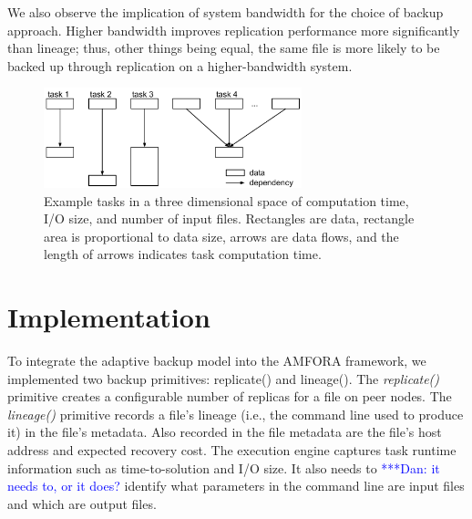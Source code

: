 \documentclass{sig-alternate}
\newcommand{\katznote}[1]{ {\textcolor{blue}    { ***Dan:      #1 }}}
\newcommand{\katznote}[1]{}
\begin{document}
We also observe the implication of system bandwidth for the choice of backup approach.
Higher bandwidth improves replication performance more significantly than lineage; thus, other things being equal, the same file is more likely to be backed up through replication on a higher-bandwidth system.

\begin{figure}[ht]
	\begin{center}
		\includegraphics[width=75mm]{pictures/task-taxonomy}
		\caption{Example tasks in a three dimensional space of computation time, I/O size, and number of input files. Rectangles are data, rectangle area is proportional to data size, arrows are data flows, and the length of arrows indicates task computation time.
		\label{fig:taxonomy}}
  	\end{center}
\end{figure}


\section{Implementation}
\label{sec:Impl}
To integrate the adaptive backup model into the AMFORA framework, we implemented two backup primitives: replicate() and lineage(). The {\em replicate()} primitive creates a configurable number of replicas for a file on peer nodes. The {\em lineage()} primitive records a file's lineage (i.e., the command line used to produce it) in the file's metadata. Also recorded in the file metadata are the file's host address and expected recovery cost. The execution engine captures task runtime information such as time-to-solution and I/O size. It also needs to \katznote{it needs to, or it does?} identify what parameters in the command line are input files and which are output files.
\end{document}
